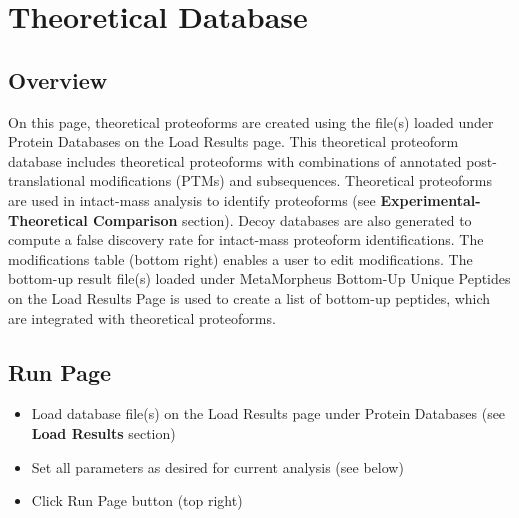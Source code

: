 
\section{Theoretical Database}

\subsection{Overview}
On this page, theoretical proteoforms are created using the file(s) loaded under Protein Databases on the Load Results page. This theoretical proteoform database includes theoretical proteoforms with combinations of annotated post-translational modifications (PTMs) and subsequences. Theoretical proteoforms are used in intact-mass analysis to identify proteoforms (see \textbf{Experimental-Theoretical Comparison} section). Decoy databases are also generated to compute a false discovery rate for intact-mass proteoform identifications. The modifications table (bottom right) enables a user to edit modifications.  The bottom-up result file(s) loaded under MetaMorpheus Bottom-Up Unique Peptides on the Load Results Page is used to create a list of bottom-up peptides, which are integrated with theoretical proteoforms. 

\subsection{Run Page}
\begin{itemize}
\item Load database file(s) on the Load Results page under Protein Databases (see \textbf{Load Results} section)
\item Set all parameters as desired for current analysis (see below)
\item Click Run Page button (top right)
\end{itemize}

